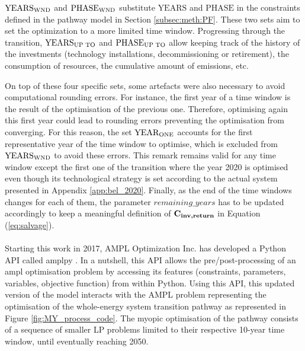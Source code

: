 $\text{YEARS}\textsubscript{WND}$ and $\text{PHASE}\textsubscript{WND}$ substitute $\text{YEARS}$ and $\text{PHASE}$ in the constraints defined in the pathway model in Section \ref{subsec:meth:PF}. These two sets aim to set the optimization to a more limited time window. Progressing through the transition, $\text{YEARS}\textsubscript{UP TO}$ and $\text{PHASE}\textsubscript{UP TO}$ allow keeping track of the history of the investments (\eg technology installations, decommissioning or retirement), the consumption of resources, the cumulative amount of emissions, etc.

On top of these four specific sets, some artefacts were also necessary to avoid computational rounding errors. For instance, the first year of a time window is the result of the optimisation of the previous one. Therefore, optimising again this first year could lead to rounding errors preventing the optimisation from converging. For this reason,  the set $\text{YEAR}\textsubscript{ONE}$ accounts for the first representative year of the time window to optimise, which is excluded from $\text{YEARS}\textsubscript{WND}$ to avoid these errors. This remark remains valid for any time window except the first one of the transition where the year 2020 is optimised even though its technological strategy is set according to the actual system presented in Appendix \ref{app:bel_2020}. Finally, as the end of the time windows changes for each of them, the parameter $remaining\_years$ has to be updated accordingly to keep a meaningful definition of $\textbf{C\textsubscript{inv,return}}$ in Equation (\ref{eq:salvage}).\\

\\

\noindent
Starting this work in 2017, AMPL Optimization Inc. has developed a Python \gls{API} called amplpy \cite{amplpy}. In a nutshell, this API allows the pre/post-processing of an ampl optimisation problem by accessing its features (\eg constraints, parameters, variables, objective function) from within Python. Using this \gls{API}, this updated version of the model interacts with the AMPL problem representing the optimisation of the whole-energy system transition pathway as represented in Figure \ref{fig:MY_process_code}. The myopic optimisation of the pathway consists of a sequence of smaller \gls{LP} problems limited to their respective 10-year time window, until eventually reaching 2050.\\


